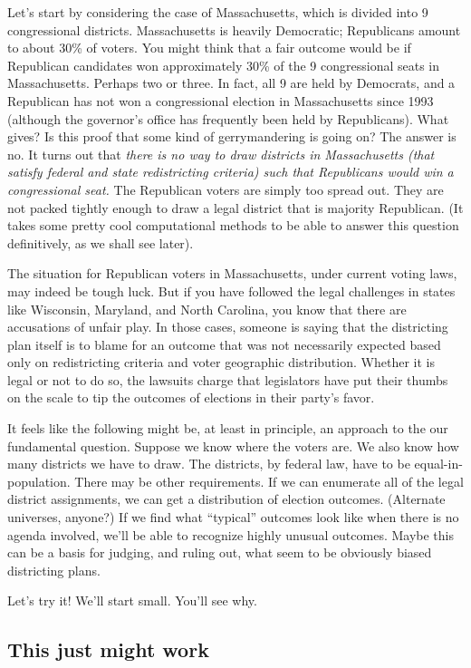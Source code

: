 \documentclass[
  openany]{book}
\begin{document}
Let's start by considering the case of Massachusetts, which is divided into 9 congressional districts. Massachusetts is heavily Democratic; Republicans amount to about 30\% of voters. You might think that a fair outcome would be if Republican candidates won approximately 30\% of the 9 congressional seats in Massachusetts. Perhaps two or three. In fact, all 9 are held by Democrats, and a Republican has not won a congressional election in Massachusetts since 1993 (although the governor's office has frequently been held by Republicans). What gives? Is this proof that some kind of gerrymandering is going on? The answer is no. It turns out that \emph{there is no way to draw districts in Massachusetts (that satisfy federal and state redistricting criteria) such that Republicans would win a congressional seat.} The Republican voters are simply too spread out. They are not packed tightly enough to draw a legal district that is majority Republican. (It takes some pretty cool computational methods to be able to answer this question definitively, as we shall see later).

The situation for Republican voters in Massachusetts, under current voting laws, may indeed be tough luck. But if you have followed the legal challenges in states like Wisconsin, Maryland, and North Carolina, you know that there are accusations of unfair play. In those cases, someone is saying that the districting plan itself is to blame for an outcome that was not necessarily expected based only on redistricting criteria and voter geographic distribution. Whether it is legal or not to do so, the lawsuits charge that legislators have put their thumbs on the scale to tip the outcomes of elections in their party's favor.

It feels like the following might be, at least in principle, an approach to the our fundamental question. Suppose we know where the voters are. We also know how many districts we have to draw. The districts, by federal law, have to be equal-in-population. There may be other requirements. If we can enumerate all of the legal district assignments, we can get a distribution of election outcomes. (Alternate universes, anyone?) If we find what ``typical'' outcomes look like when there is no agenda involved, we'll be able to recognize highly unusual outcomes. Maybe this can be a basis for judging, and ruling out, what seem to be obviously biased districting plans.

Let's try it! We'll start small. You'll see why.

\hypertarget{this-just-might-work}{%
\subsection*{This just might work}\label{this-just-might-work}}
\end{document}

